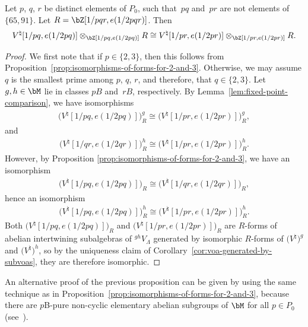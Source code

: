 \begin{prop} \label{prop:full-comparison-of-forms} Let $p$, $q$, $r$ be distinct elements of $P_0$, such that~$pq$ and~$pr$ are not elements of $\{ 65, 91\}$. Let $R = \bZ[1/pqr,e(1/2pqr)]$. Then
\begin{gather*} V^\natural[1/pq, e(1/2pq)] \otimes_{\bZ[1/pq, e(1/2pq)]} R \cong V^\natural[1/pr, e(1/2pr)] \otimes_{\bZ[1/pr, e(1/2pr)]} R. \end{gather*}
\end{prop}
\begin{proof}
We first note that if $p \in \{2,3\}$, then this follows from Proposition~\ref{prop:isomorphisms-of-forms-for-2-and-3}. Otherwise, we may assume $q$ is the smallest prime among $p$, $q$, $r$, and therefore, that $q \in \{2,3\}$. Let $g,h \in \bM$ lie in classes $pB$ and~$rB$, respectively. By Lemma~\ref{lem:fixed-point-comparison}, we have isomorphisms
\begin{gather*} \big(V^\natural[1/pq,e(1/2pq)]\big)^g_R \cong \big(V^\natural[1/pr,e(1/2pr)]\big)^g_R, \end{gather*}
and
\begin{gather*} \big(V^\natural[1/qr,e(1/2qr)]\big)^h_R \cong \big(V^\natural[1/pr,e(1/2pr)]\big)^h_R. \end{gather*}
However, by Proposition \ref{prop:isomorphisms-of-forms-for-2-and-3}, we have an isomorphism
\begin{gather*} \big(V^\natural[1/pq,e(1/2pq)]\big)_R \cong \big(V^\natural[1/qr,e(1/2qr)]\big)_R, \end{gather*}
hence an isomorphism
\begin{gather*} \big(V^\natural[1/pq,e(1/2pq)]\big)^h_R \cong \big(V^\natural[1/pr,e(1/2pr)]\big)^h_R. \end{gather*}
Both $\big(V^\natural[1/pq,e(1/2pq)]\big)_R$ and $\big(V^\natural[1/pr,e(1/2pr)]\big)_R$ are $R$-forms of abelian intertwining subalgebras of ${}^{gh}V_\Lambda$ generated by isomorphic $R$-forms of $\big(V^\natural\big)^g$ and $\big(V^\natural\big)^h$, so by the uniqueness claim of Corollary~\ref{cor:voa-generated-by-subvoas}, they are therefore isomorphic.
\end{proof}

\begin{rem}An alternative proof of the previous proposition can be given by using the same technique as in Proposition~\ref{prop:isomorphisms-of-forms-for-2-and-3}, because there are $p$B-pure non-cyclic elementary abelian subgroups of $\bM$ for all $p \in P_0$ (see~\cite{W88}).
\end{rem}

